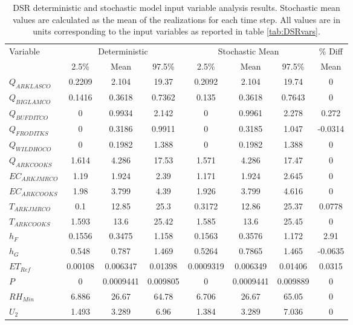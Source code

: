 \begin{linenumbers}
\begin{table}[htbp]
  \centering
  \caption[DSR deterministic and stochastic model input variable analysis results.]{DSR deterministic and stochastic model input variable analysis results.  Stochastic mean values are calculated as the mean of the realizations for each time step.  All values are in units corresponding to the input variables as reported in table \ref{tab:DSRvars}.}
  \label{tab:DSRVarResults}
    \begin{tabular}{l|ccc|ccc|c}
    \toprule
    \multirow{2}[0]{*}{Variable} & \multicolumn{3}{c}{Deterministic} & \multicolumn{3}{c}{Stochastic Mean} & \% Diff\\\cline{2-4} \cline{5-7}
    & 2.5\% & Mean & 97.5\% & 2.5\% & Mean & 97.5\% & Mean\\
    \midrule
    \midrule
	$Q_{ARKLASCO}$&	0.2209&	2.104&	19.37&	0.2092&	2.104&	19.74&	0\\                             
	$Q_{BIGLAMCO}$&	0.1416&	0.3618&	0.7362&	0.135&	0.3618&	0.7643&	0\\                             
	$Q_{BUFDITCO}$&	0&	0.9934&	2.142&	0&	0.9961&	2.278&	0.272\\                                 
	$Q_{FRODITKS}$&	0&	0.3186&	0.9911&	0&	0.3185&	1.047&	-0.0314\\                               
	$Q_{WILDHOCO}$&	0&	0.1982&	1.388&	0&	0.1982&	1.388&	0\\                                     
	$Q_{ARKCOOKS}$&	1.614&	4.286&	17.53&	1.571&	4.286&	17.47&	0\\                             
	$EC_{ARKJMRCO}$&1.19&	1.924&	2.39&	1.171&	1.924&	2.645&	0\\                             
	$EC_{ARKCOOKS}$&1.98&	3.799&	4.39&	1.926&	3.799&	4.616&	0\\                             
	$T_{ARKJMRCO}$&	0.1&	12.85&	25.3&	0.3172&	12.86&	25.37&	0.0778\\                        
	$T_{ARKCOOKS}$&	1.593&	13.6&	25.42&	1.585&	13.6&	25.45&	0\\                             
	$h_{F}$&		0.1556&	0.3475&	1.158&	0.1563&	0.3576&	1.172&	2.91\\                          
	$h{_G}$&		0.548&	0.787&	1.469&	0.5264&	0.7865&	1.465&	-0.0635\\                       
	$ET_{Ref}$&		0.00108&	0.006347&	0.01398&	0.0009319&	0.006349&	0.01406&	0.0315\\
	$P$&			0&	0.0009441&	0.009805&	0&	0.0009441&	0.009889&	0\\                     
	$RH_{Min}$&		6.886&	26.67&	64.78&	6.706&	26.67&	65.05&	0\\                             
	$U_{2}$&		1.493&	3.289&	6.96&	1.384&	3.289&	7.036&	0\\                             
    \bottomrule
    \end{tabular}
\end{table}


\end{linenumbers}
